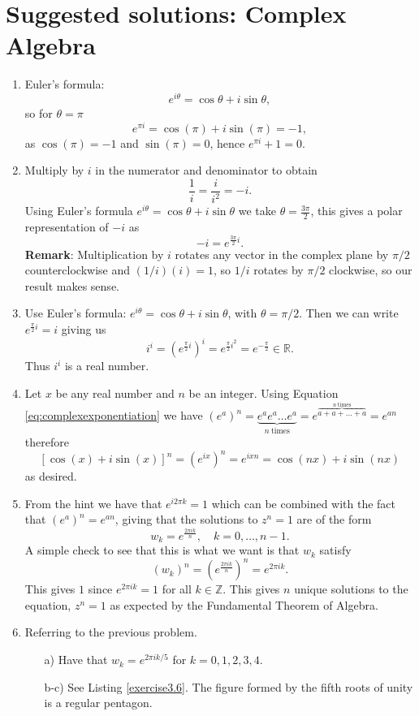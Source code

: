 \newpage
\section{Suggested solutions: Complex Algebra}
\begin{enumerate}

\item Euler's formula:
$$e^{i\theta}=\cos\theta+i\sin\theta,$$
so for $\theta=\pi$
$$e^{\pi i}=\cos(\pi)+i\sin(\pi)=-1,$$
as $\cos(\pi)=-1$ and $\sin(\pi)=0$, hence $e^{\pi i}+1=0$. 

\item Multiply by $i$ in the numerator and denominator to obtain
$$\frac{1}{i}=\frac{i}{i^{2}}=-i.$$
Using Euler's formula $e^{i\theta}=\cos\theta+i\sin\theta$ we take $\theta=\frac{3\pi}{2}$, this gives a polar representation of $-i$ as
$$-i=e^{\frac{3\pi}{2}i}.$$
\textbf{Remark}: Multiplication by $i$ rotates any vector in the complex plane by $\pi/2$ counterclockwise and $(1/i)(i)=1$, so $1/i$ rotates by $\pi/2$ clockwise, so our result makes sense. 

\item Use Euler's formula: $e^{i\theta}=\cos\theta+i\sin\theta$, with $\theta=\pi/2$. Then we can write $e^{\frac{\pi}{2}i}=i$ giving us
$$i^{i}=(e^{\frac{\pi}{2}i})^{i}=e^{\frac{\pi}{2}i^{2}}=e^{-\frac{\pi}{2}}\in\mathbb{R}.$$
Thus $i^{i}$ is a real number. 

\item Let $x$ be any real number and $n$ be an integer. Using Equation \ref{eq:complexexponentiation} we have $(e^{a})^{n}=\underbrace{e^{a}e^{a}\hdots e^{a}}_{n\ \text{times}}=e^{\overbrace{a+a+\hdots+a}^{n\ \text{times}}}=e^{an}$ therefore 
$$[\cos(x)+i\sin(x)]^{n}=(e^{ix})^{n}=e^{ixn}=\cos(nx)+i\sin(nx)$$
as desired. 

\item From the hint we have that $e^{i2\pi k}=1$ which can be combined with the fact that $(e^{a})^{n}=e^{an}$, giving that the solutions to $z^{n}=1$ are of the form
$$w_{k}=e^{\frac{2\pi i k}{n}}, \quad k=0,\hdots,n-1.$$
A simple check to see that this is what we want is that $w_{k}$ satisfy
$$(w_{k})^{n}=(e^{\frac{2\pi ik}{n}})^{n}=e^{2\pi ik}.$$
This gives $1$ since $e^{2\pi ik}=1$ for all $k\in\mathbb{Z}$. This gives $n$ unique solutions to the equation, $z^{n}=1$ as expected by the Fundamental Theorem of Algebra.  

\item Referring to the previous problem.
\begin{itemize}
    \item[a)] Have that $w_{k}=e^{2\pi ik/5}$ for $k=0,1,2,3,4$. 
    \item[b-c)] See Listing \ref{exercise3.6}. The figure formed by the fifth roots of unity is a regular pentagon. 
\end{itemize}


\end{enumerate}
